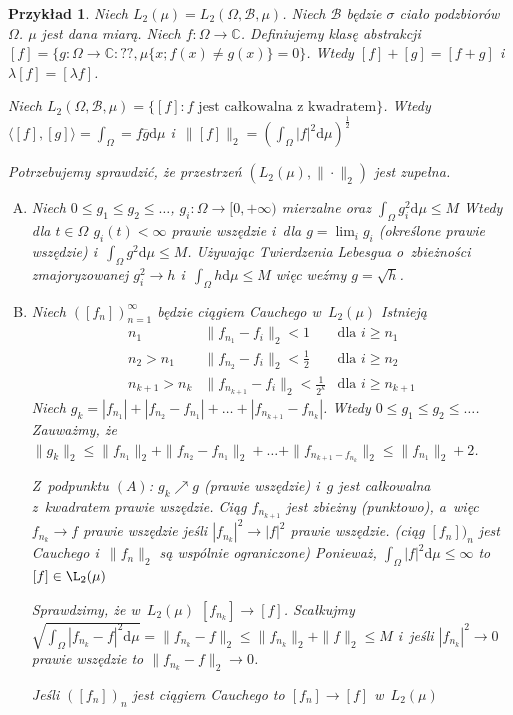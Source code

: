\documentclass[11pt]{mwrep}
\renewcommand{\[}{\begin{equation}}
\renewcommand{\]}{\end{equation}}
\newcommand{\C}{{\ensuremath{\mathbb C}}}
\newcommand{\dd}{\mathrm{d}}
\newcommand{\norm}{\|\cdot\|}
\newtheorem{ex}[subsection]{Przykład}
\newcounter{numer}
\begin{document}
\begin{ex}
	Niech $L_2(\mu) = L_2 (\Omega,\mathcal{B},\mu)$. Niech $\mathcal{B}$ będzie $\sigma$ ciało podzbiorów $\Omega$. $\mu$ jest dana miarą.
	Niech $f\colon \Omega \to \C$. Definiujemy klasę abstrakcji $[f] = \{ g: \Omega \to \C : ??, \mu\{x; f(x) \not = g(x) \} =0\}$.
	Wtedy $[f]+[g] = [f+g]$ i~$\lambda[f] = [\lambda f]$.\par
	Niech $L_2 (\Omega,\mathcal{B} ,\mu) = \{[f]: f\textrm{ jest całkowalna z kwadratem}\}$.
	Wtedy $\langle [f],[g] \rangle = \int_\Omega = f \overline{g} \dd \mu$ i~$\|[f]\|_2 = \left( \int_\Omega |f|^2 \dd\mu \right)^{\frac{1}{2}}$\par
	Potrzebujemy sprawdzić, że przestrzeń $(L_2 (\mu) ,\norm_2)$ jest zupełna.
	\begin{enumerate}[(A)]
		\item Niech $0\le g_1 \le g_2 \le \ldots$, $g_i\colon \Omega \to [0,+\infty)$ mierzalne oraz $\int_\Omega g_i^2 \dd\mu \le M$ 
			Wtedy dla $t\in \Omega$ $g_i(t) < \infty$ prawie wszędzie i~dla $g = \lim_i g_i $ 
			(określone prawie wszędzie) i~$\int_\Omega g^2 \dd \mu \le M$. 
			Używając Twierdzenia Lebesgua o~zbieżności zmajoryzowanej $g_i^2 \to h$ i~$\int_\Omega h \dd \mu \le M$ więc weźmy $g=\sqrt{h}$.
		\item Niech $([f_n])_{n=1}^\infty$ będzie ciągiem Cauchego w~$L_2(\mu)$ 
			Istnieją 
			$$\begin{array}{lll}
				n_1 & \|f_{n_1} - f_i \|_2 < 1 & \textrm{dla } i\ge n_1\\
				n_2>n_1 & \|f_{n_2} - f_i  \|_2 < \frac{1}{2} & \textrm{dla } i \ge n_2\\
				n_{k+1} > n_k & \|f_{n_{k+1}} - f_i \|_2 < \frac{1}{2^k}& \textrm{dla } i\ge n_{k+1}
			\end{array}$$
			Niech $g_k = |f_{n_1}| + |f_{n_2} - f_{n_1}| + \ldots+ |f_{n_{k+1}} - f_{n_k}|$.
			Wtedy $0\le g_1 \le g_2\le\ldots$.
			Zauważmy, że $\|g_k\|_2 \le \|f_{n_1}\|_2 + \|f_{n_2} - f_{n_1}\|_2+\ldots+\|f_{n_{k+1} - f_{n_k}}\|_2 \le \|f_{n_1}\|_2+2$.\par
			Z~podpunktu $(A)$: $g_k \nearrow g$ (prawie wszędzie) i~$g$ jest całkowalna z~kwadratem prawie wszędzie. 
			Ciąg $f_{n_{k+1}}$ jest zbieżny (punktowo), a~więc $f_{n_k} \to f$ prawie wszędzie  jeśli $|f_{n_k}|^2 \to |f|^2$ prawie wszędzie.
			(ciąg $[f_n])_n$ jest Cauchego i~$\|f_n\|_2$ są wspólnie ograniczone)
			Ponieważ, $\int_\Omega |f|^2 \dd \mu \le \infty$ to $[f]\in \L_2(\mu)$ \par
			Sprawdzimy, że w~$L_2(\mu)$ $[f_{n_k}]\to[f]$.
			Scałkujmy $\sqrt{\int_\Omega |f_{n_k} - f|^2 \dd \mu} = \|f_{n_k}-f\|_2 \le \|f_{n_k}\|_2 + \|f\|_2\le M$
			i~jeśli $|f_{n_k}|^2  \to 0$ prawie wszędzie to $\|f_{n_k}-f\|_2 \to 0$. \par
			Jeśli $([f_n])_n$ jest ciągiem Cauchego to $[f_n] \to [f]$ w~$L_2(\mu)$
	\end{enumerate}

\end{ex}
\end{document}
